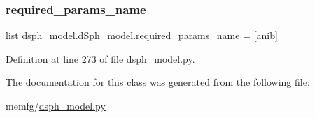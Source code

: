 \mbox{\label{classdsph__model_1_1dSph__model_a74f031f3929b9123b00121c1b02b8b71}} 
\subsubsection{\texorpdfstring{required\+\_\+params\+\_\+name}{required\_params\_name}}
{\footnotesize\ttfamily list dsph\+\_\+model.\+d\+Sph\+\_\+model.\+required\+\_\+params\+\_\+name = \mbox{[}\textquotesingle{}anib\textquotesingle{}\mbox{]}\hspace{0.3cm}{\ttfamily [static]}}



Definition at line 273 of file dsph\+\_\+model.\+py.



The documentation for this class was generated from the following file\+:\begin{DoxyCompactItemize}
\item 
memfg/\hyperlink{dsph__model_8py}{dsph\+\_\+model.\+py}\end{DoxyCompactItemize}
